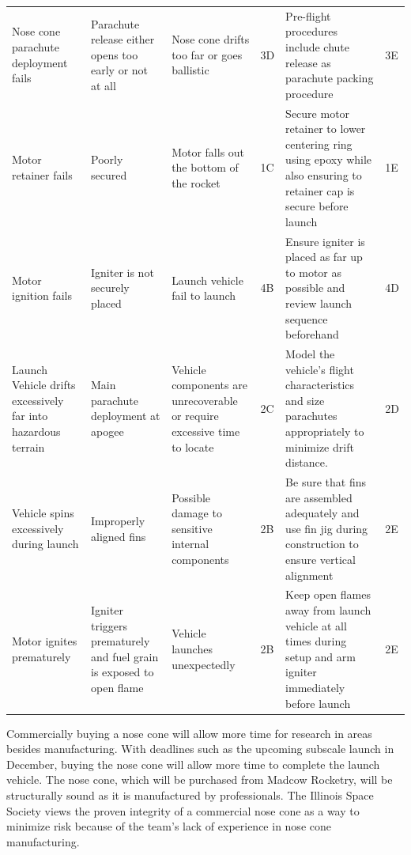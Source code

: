\begin{table}[]
{\begin{tabularx}{\linewidth}{XXXlXl}
    Nose cone parachute deployment fails & Parachute release either opens too early or not at all & Nose cone drifts too far or goes ballistic & \cellcolor{green!25} 3D & Pre-flight procedures include chute release as parachute packing procedure & \cellcolor{green!25} 3E \\
    Motor retainer fails & Poorly secured & Motor falls out the bottom of the rocket & \cellcolor{red!25} 1C & Secure motor retainer to lower centering ring using epoxy while also ensuring to retainer cap is secure before launch & \cellcolor{green!25} 1E \\
    Motor ignition fails & Igniter is not securely placed & Launch vehicle fail to launch & \cellcolor{green!25} 4B & Ensure igniter is placed as far up to motor as possible and review launch sequence beforehand & 4D \\
    Launch Vehicle drifts excessively far into hazardous terrain & Main parachute deployment at apogee & Vehicle components are unrecoverable or require excessive time to locate & \cellcolor{orange!25} 2C & Model the vehicle’s flight characteristics and size parachutes appropriately to minimize drift distance. & \cellcolor{orange!25} 2D \\
    Vehicle spins excessively during launch & Improperly aligned fins & Possible damage to sensitive internal components & \cellcolor{red!25} 2B & Be sure that fins are assembled adequately and use fin jig during construction to ensure vertical alignment & \cellcolor{green!25} 2E \\
    Motor ignites prematurely & Igniter triggers prematurely and fuel grain is exposed to open flame & Vehicle launches unexpectedly & \cellcolor{red!25} 2B & Keep open flames away from launch vehicle at all times during setup and arm igniter immediately before launch & \cellcolor{green!25} 2E\\
    \bottomrule
    \end{tabularx}
    }
\end{table}

Commercially buying a nose cone will allow more time for research in areas besides manufacturing. With deadlines such as the upcoming subscale launch in December, buying the nose cone will allow more time to complete the launch vehicle. The nose cone, which will be purchased from Madcow Rocketry, will be structurally sound as it is manufactured by professionals. The Illinois Space Society views the proven integrity of a commercial nose cone as a way to minimize risk because of the team’s lack of experience in nose cone manufacturing.
 
